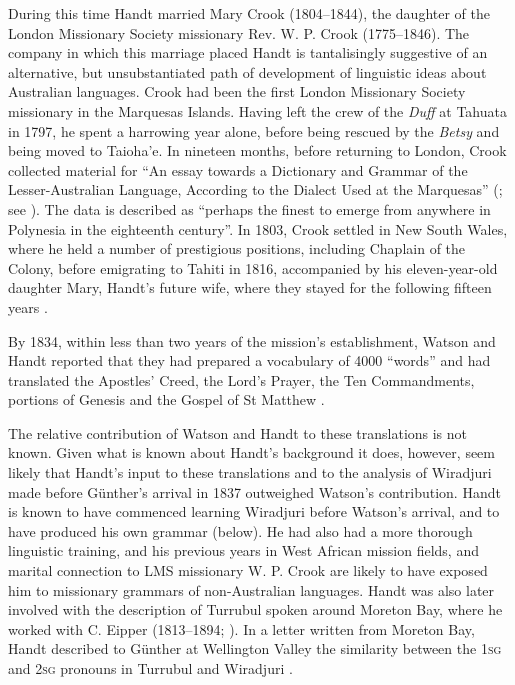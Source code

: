During this time Handt married Mary Crook (1804--1844), the daughter of the London Missionary Society missionary Rev. W. P. Crook (1775--1846). The company in which this marriage placed Handt is tantalisingly suggestive of an alternative, but unsubstantiated path of development of linguistic ideas about Australian languages. Crook had been the first London Missionary Society missionary in the Marquesas Islands. Having left the crew of the \textit{Duff} at Tahuata in 1797, he spent a harrowing year alone, before being rescued by the \textit{Betsy} and being moved to Taioha’e. In nineteen months, before returning to London, Crook collected material for “An essay towards a Dictionary and Grammar of the Lesser-Australian Language, According to the Dialect Used at the Marquesas” (\citeyear{crook_essay_1799}; see \citealt{hughes_introduction_1998}). The data is described \citep[xxiv]{hughes_introduction_1998} as “perhaps the finest to emerge from anywhere in Polynesia in the eighteenth century”. In 1803, Crook settled in New South Wales, where he held a number of prestigious positions, including Chaplain of the Colony, before emigrating to Tahiti in 1816, accompanied by his eleven-year-old daughter Mary, Handt’s future wife, where they stayed for the following fifteen years \citep[308]{bridges_church_1978}.

By 1834, within less than two years of the mission’s establishment, Watson and Handt reported that they had prepared a vocabulary of 4000 “words” and had translated the Apostles' Creed, the Lord’s Prayer, the Ten Commandments, portions of Genesis and the Gospel of St Matthew \citep[12]{allen_2011}. 

The relative contribution of Watson and Handt to these translations is not known. Given what is known about Handt’s background it does, however, seem likely that Handt’s input to these translations and to the analysis of Wiradjuri made before Günther’s arrival in 1837 outweighed Watson’s contribution. Handt is known to have commenced learning Wiradjuri before Watson’s arrival, and to have produced his own grammar (below). He had also had a more thorough linguistic training, and his previous years in West African mission fields, and marital connection to LMS missionary W. P. Crook are likely to have exposed him to missionary grammars of non-Australian languages. Handt was also later involved with the description of Turrubul spoken around Moreton Bay, where he worked with C. Eipper (1813--1894; ). In a letter written from Moreton Bay, Handt described to Günther at Wellington Valley the similarity between the 1\textsc{sg} and 2\textsc{sg} pronouns in Turrubul and Wiradjuri \citep[175]{newton_more_1987}.

